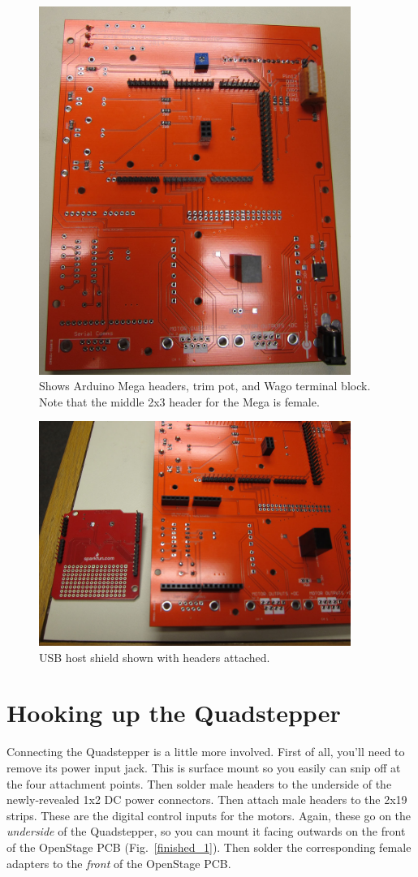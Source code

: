 \documentclass[11pt]{report} %
\begin{document}
\begin{figure}[!ht]
\centering
\includegraphics[width=4in]{IMG_3203.JPG}
\caption{Shows Arduino Mega headers, trim pot, and Wago terminal block. Note that the middle 2x3 header for the Mega is female.}
\label{megaHeader}
\end{figure}

\begin{figure}[!ht]
\centering
\includegraphics[width=4in]{IMG_3209.JPG}
\caption{USB host shield shown with headers attached. }
\label{usbHost}
\end{figure}

\clearpage

\section{Hooking up the Quadstepper}
Connecting the Quadstepper is a little more involved. First of all, you'll need to remove its power input jack. This is surface mount so you easily can snip off at the four attachment points. Then solder male headers to the underside of the newly-revealed 1x2 DC power connectors. Then attach male headers to the 2x19 strips. These are the digital control inputs for the motors. Again, these go on the \textit{underside} of the Quadstepper, so you can mount it facing outwards on the front of the OpenStage PCB (Fig.~\ref{finished_1}). Then solder the corresponding female adapters to the \textit{front} of the OpenStage PCB. 
\end{document}
